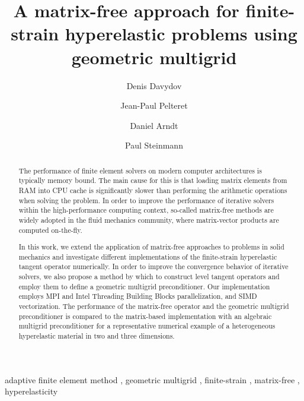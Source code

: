 \documentclass[preprint,12pt,times]{elsarticle}
\begin{document}
\begin{frontmatter}
  \title{
  A matrix-free approach for finite-strain hyperelastic problems using geometric multigrid
  }

  \author[a]{Denis Davydov}

  \author[a]{Jean-Paul Pelteret}

  \author[b]{Daniel Arndt}

  \author[a,c]{Paul Steinmann}


  \address[a]{Chair of Applied Mechanics,
  Friedrich-Alexander-Universit\"{a}t Erlangen-N\"{u}rnberg,
  Egerlandstr.\ 5, 91058 Erlangen, Germany}

  \address[b]{Interdisciplinary Center for Scientific Computing (IWR),
      Heidelberg University,
      Im Neuenheimer Feld 205,
      69120 Heidelberg,
      Germany}

  \address[c]{Glasgow Computational Engineering Center (GCEC),
      University of Glasgow, G12 8QQ Glasgow, United Kingdom
  }


  \begin{abstract}
    The performance of finite element solvers on modern computer architectures is typically memory bound.
    The main cause for this is that loading matrix elements from RAM into CPU cache is significantly slower than performing the arithmetic operations when solving the problem.
    In order to improve the performance of iterative solvers within the high-performance computing context, so-called matrix-free methods are
    widely adopted in the fluid mechanics community, where matrix-vector products are computed on-the-fly.

    In this work, we extend the application of matrix-free approaches to problems in solid mechanics and investigate different implementations of the finite-strain hyperelastic tangent operator numerically.
    In order to improve the convergence behavior of iterative solvers, we also propose a method by which to construct level tangent operators
    and employ them to define a geometric multigrid preconditioner.
    Our implementation employs MPI and Intel Threading Building Blocks parallelization, and SIMD vectorization.
    The performance of the matrix-free operator and the geometric multigrid preconditioner is compared to the matrix-based implementation with an algebraic multigrid preconditioner for a representative numerical example of a heterogeneous hyperelastic material in two and three dimensions.
  \end{abstract}


  \begin{keyword}
      adaptive finite element method \sep
      geometric multigrid \sep
      finite-strain \sep
      matrix-free \sep
      hyperelasticity
  \end{keyword}

  \end{frontmatter}
\end{document}
